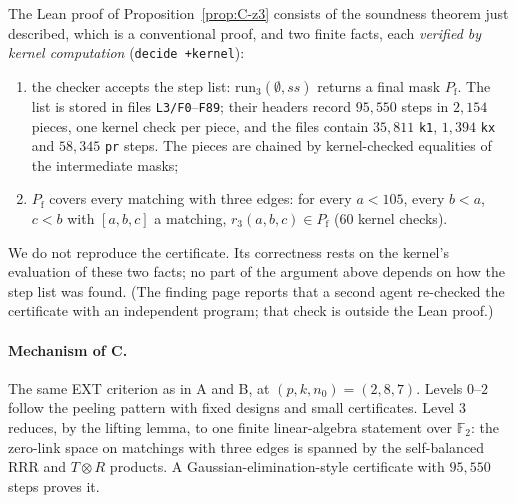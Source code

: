 The Lean proof of Proposition~\ref{prop:C-z3} consists of the soundness theorem
just described, which is a conventional proof, and two finite facts, each
\emph{verified by kernel computation} (\texttt{decide +kernel}):
\begin{enumerate}
\item the checker accepts the step list: $\mathrm{run}_3(\emptyset,\mathit{ss})$ returns a
final mask $P_{\mathrm f}$.  The list is stored in files \texttt{L3/F0}--\texttt{F89};
their headers record $95{,}550$ steps in $2{,}154$ pieces, one kernel check per piece,
and the files contain $35{,}811$ \texttt{k1}, $1{,}394$ \texttt{kx} and $58{,}345$
\texttt{pr} steps.  The pieces are chained by kernel-checked equalities of the
intermediate masks;
\item $P_{\mathrm f}$ covers every matching with three edges: for every $a<105$, every
$b<a$, $c<b$ with $[a,b,c]$ a matching, $r_3(a,b,c)\in P_{\mathrm f}$
($60$ kernel checks).
\end{enumerate}
We do not reproduce the certificate.  Its correctness rests on the kernel's
evaluation of these two facts; no part of the argument above depends on how the
step list was found.  (The finding page reports that a second agent re-checked the
certificate with an independent program; that check is outside the Lean proof.)

\paragraph{Mechanism of C.}
The same EXT criterion as in A and B, at $(p,k,n_0)=(2,8,7)$.  Levels $0$--$2$
follow the peeling pattern with fixed designs and small certificates.  Level $3$
reduces, by the lifting lemma, to one finite linear-algebra statement over
$\mathbb F_2$: the zero-link space on matchings with three edges is spanned by the
self-balanced RRR and $T\otimes R$ products.  A Gaussian-elimination-style
certificate with $95{,}550$ steps proves it.
\endgroup
